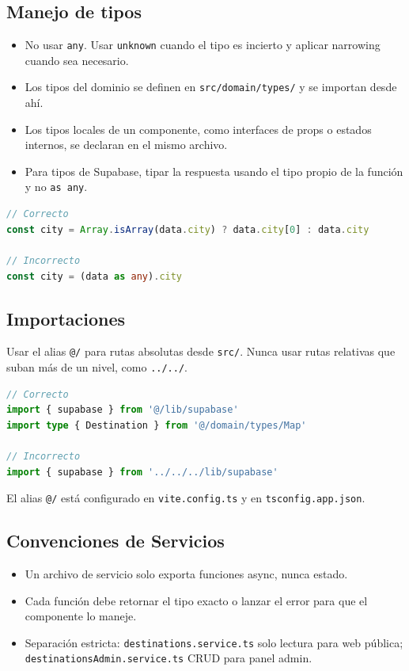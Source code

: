 \documentclass[12pt,letterpaper]{article}
\newcommand{\code}[1]{\texttt{#1}}
\begin{document}
\subsection{Manejo de tipos}

\begin{itemize}
    \item No usar \code{any}. Usar \code{unknown} cuando el tipo es incierto y aplicar narrowing cuando sea necesario.
    \item Los tipos del dominio se definen en \code{src/domain/types/} y se importan desde ahí.
    \item Los tipos locales de un componente, como interfaces de props o estados internos, se declaran en el mismo archivo.
    \item Para tipos de Supabase, tipar la respuesta usando el tipo propio de la función y no \code{as any}.
\end{itemize}

\begin{lstlisting}[language=typescript]
// Correcto
const city = Array.isArray(data.city) ? data.city[0] : data.city

// Incorrecto
const city = (data as any).city
\end{lstlisting}

\subsection{Importaciones}

Usar el alias \code{@/} para rutas absolutas desde \code{src/}. Nunca usar rutas relativas que suban más de un nivel, como \code{../../}.

\begin{lstlisting}[language=typescript]
// Correcto
import { supabase } from '@/lib/supabase'
import type { Destination } from '@/domain/types/Map'

// Incorrecto
import { supabase } from '../../../lib/supabase'
\end{lstlisting}

El alias \code{@/} está configurado en \code{vite.config.ts} y en \code{tsconfig.app.json}.

\subsection{Convenciones de Servicios}

\begin{itemize}
    \item Un archivo de servicio solo exporta funciones async, nunca estado.
    \item Cada función debe retornar el tipo exacto o lanzar el error para que el componente lo maneje.
    \item Separación estricta: \code{destinations.service.ts} solo lectura para web pública; \code{destinationsAdmin.service.ts} CRUD para panel admin.
\end{itemize}
\end{document}
